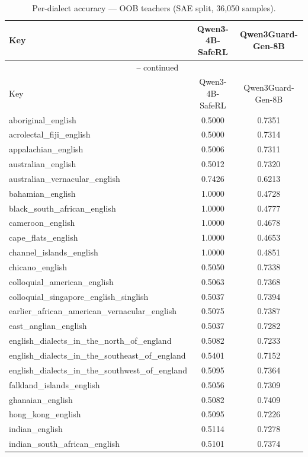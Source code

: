\begin{landscape}
\begin{longtable}{lcc}
\caption{Per-dialect accuracy — OOB teachers (SAE split, 36{,}050 samples).} \\
\label{tab:oob_teachers_per_dialect_sae}
\toprule
Key & Qwen3-4B-SafeRL & Qwen3Guard-Gen-8B \\
\midrule
\endfirsthead
\multicolumn{3}{c}{\tablename\ \thetable{} -- continued} \\
\toprule
Key & Qwen3-4B-SafeRL & Qwen3Guard-Gen-8B \\
\midrule
\endhead
aboriginal\_english & 0.5000 & 0.7351 \\
acrolectal\_fiji\_english & 0.5000 & 0.7314 \\
appalachian\_english & 0.5006 & 0.7311 \\
australian\_english & 0.5012 & 0.7320 \\
australian\_vernacular\_english & 0.7426 & 0.6213 \\
bahamian\_english & 1.0000 & 0.4728 \\
black\_south\_african\_english & 1.0000 & 0.4777 \\
cameroon\_english & 1.0000 & 0.4678 \\
cape\_flats\_english & 1.0000 & 0.4653 \\
channel\_islands\_english & 1.0000 & 0.4851 \\
chicano\_english & 0.5050 & 0.7338 \\
colloquial\_american\_english & 0.5063 & 0.7368 \\
colloquial\_singapore\_english\_singlish & 0.5037 & 0.7394 \\
earlier\_african\_american\_vernacular\_english & 0.5075 & 0.7387 \\
east\_anglian\_english & 0.5037 & 0.7282 \\
english\_dialects\_in\_the\_north\_of\_england & 0.5082 & 0.7233 \\
english\_dialects\_in\_the\_southeast\_of\_england & 0.5401 & 0.7152 \\
english\_dialects\_in\_the\_southwest\_of\_england & 0.5095 & 0.7364 \\
falkland\_islands\_english & 0.5056 & 0.7309 \\
ghanaian\_english & 0.5082 & 0.7409 \\
hong\_kong\_english & 0.5095 & 0.7226 \\
indian\_english & 0.5114 & 0.7278 \\
indian\_south\_african\_english & 0.5101 & 0.7374 \\

\end{longtable}
\end{landscape}

